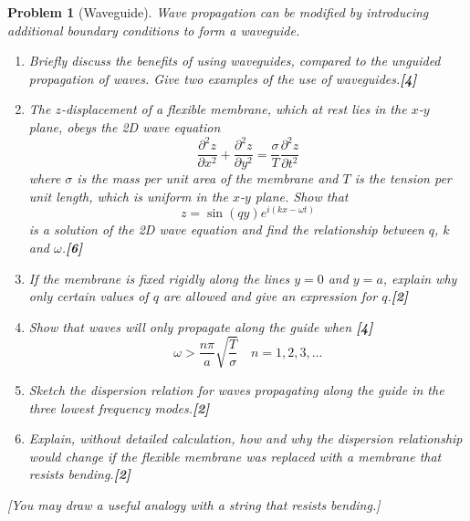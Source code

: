 \documentclass[a4paper]{article}
\theoremstyle{new}
\newtheorem{qns}{Problem}[subsection]
\begin{document}
\begin{qns}[Waveguide]
Wave propagation can be modified by introducing additional boundary conditions to form a waveguide.
\begin{enumerate}[label=(\alph*)]
\item Briefly discuss the benefits of using waveguides, compared to the unguided propagation of waves. Give two examples of the use of waveguides.\hfill\textbf{[4]}
\item The $z$-displacement of a flexible membrane, which at rest lies in the $x$-$y$ plane, obeys the 2D wave equation
$$\frac{\partial^2z}{\partial x^2}+\frac{\partial^2z}{\partial y^2}=\frac{\sigma}{T}\frac{\partial^2z}{\partial t^2}$$
where $\sigma$ is the mass per unit area of the membrane and $T$ is the tension per unit length, which is uniform in the $x$-$y$ plane. Show that
$$z=\sin(qy)e^{i(kx-\omega t)}$$
is a solution of the 2D wave equation and find the relationship between $q$, $k$ and $\omega$.\hfill\textbf{[6]}
\item If the membrane is fixed rigidly along the lines $y = 0$ and $y = a$, explain why only certain values of $q$ are allowed and give an expression for $q$.\hfill\textbf{[2]}
\item Show that waves will only propagate along the guide when \hfill\textbf{[4]}
$$\omega>\frac{n\pi}{a}\sqrt{\frac{T}{\sigma}} \quad n=1,2,3,...$$
\item Sketch the dispersion relation for waves propagating along the guide in the three lowest frequency modes.\hfill\textbf{[2]}
\item Explain, without detailed calculation, how and why the dispersion relationship would change if the flexible membrane was replaced with a membrane that resists bending.\hfill\textbf{[2]}
\end{enumerate}
[You may draw a useful analogy with a string that resists bending.]
\end{qns}
\newpage
\end{document}
